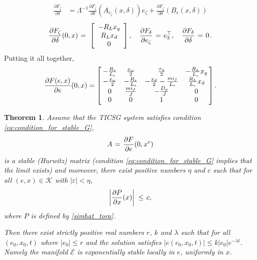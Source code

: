 \documentclass[letterpaper,10pt,conference]{ieeeconf}
\newtheorem{theorem}{Theorem}[section]
\renewcommand{\l}    {{\lambda}}
\renewcommand{\L}    {{\Lambda}}
\renewcommand{\o}    {{\omega}}
\newcommand{\e}      {{\varepsilon}}
\newcommand{\m}      {{\hbox{\hskip 1pt}}}
\newcommand{\nm}     {{\hbox{\hskip -3pt}}}
\newcommand{\Emscr}  {{\mathcal{E}}}
\newcommand{\Kmscr}  {{\mathcal{K}}}
\begin{document}
$$ \begin{aligned} \frac{\partial F_\zeta}{\partial \delta} & =  
   \L^{-1} \frac{\partial F_\zeta}{\partial \delta}\left( 
   A_{e_\zeta}(x,\delta) \right)e_\zeta + \frac{\partial F_\zeta}
   {\partial \delta}\left(B_e(x,\delta)\right) \end{aligned}$$
$$ \frac{\partial F_\zeta}{\partial \delta}(0,x) \m=\m \left[
   \begin{array}{ccc} -R_L x_q\\ R_L x_d\\ 0\end{array}\right],
   \quad \frac{\partial F_\delta}{\partial e_\zeta} \m=\m 
   e_3^\top,\quad \frac{\partial F_\delta}{\partial \delta}
   \m=\m 0 \m.$$
Putting it all together,
\begin{equation} \label{eq:AOft}
   \frac{\partial F(e,x)}{\partial e}(0,x) = \left[\nm
   \begin{array}{cccc} -\frac{R_s}{L_s} & \frac{x_{\o}}{2} & 
   \frac{x_q}{2} & -\frac{R_L}{L_s} x_q\\ -\frac{x_{\o}}{2} &
   -\frac{R_s}{L_s} & -\frac{x_d}{2}-\frac{mi_f}{L_s} & 
   \frac{R_L}{L_s} x_d\\ 0 & \frac{mi_f}{J} & -\frac{D_p}{J} 
   & 0\\ 0 & 0 & 1 & 0 \end{array} \nm\right].
\end{equation}

\begin{theorem} \label{theorem:TICSGSync}
Assume that the TICSG system satisfies condition 
\eqref{eq:condition_for_stable_G}, \vspace{-3mm}
\begin{equation} \label{eq:eLinearizationLimit}
   A \m=\m \frac{\partial F}{\partial e}(0,x^e)
\end{equation}
is a stable (Hurwitz) matrix (condition
\eqref{eq:condition_for_stable_G} implies that the limit exists) and
moreover, there exist positive numbers $\eta$ and $c$ such that for
all $(e,x)\in\Kmscr$ with $|\e|<\eta$,
$$\left| \frac{\partial P}{\partial x}(x)\right| \m\leq\m c,$$
where $P$ is defined by \eqref{simhat_tora}. 

Then there exist strictly positive real numbers $r$, $k$ and $\l$ such
that for all $\left(e_0, x_0, t\right)$ where $\left|e_0\right|\leq r$
and the solution satisfies $\left| e\left( e_0,x_0,t\right)\right|\leq
k\left|e_0\right|e^{-\l t}$. Namely the manifold $\Emscr$ is
exponentially stable locally in $e$, uniformly in $x$.
\end{theorem}
 
\end{document}
